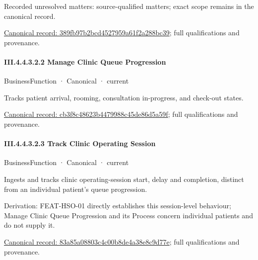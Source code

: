 {\small Recorded unresolved matters: source-qualified matters; exact scope remains in the canonical record.}\par
{\footnotesize \href{../../../../../../../continuum/business/business-function/389fb97b2bcd4527959a61f2a288bc39.md}{Canonical record: 389fb97b2bcd4527959a61f2a288bc39}; full qualifications and provenance.}\par
\paragraph*{III.4.4.3.2.2 Manage Clinic Queue Progression}
\label{navigation:III.4.4.3.2.2}

\label{element:cb3f8c48623b4479988c45de86d5a59f}
{\small BusinessFunction · Canonical · current}\par

Tracks patient arrival, rooming, consultation in-progress, and check-out states.


{\footnotesize \href{../../../../../../../continuum/business/business-function/cb3f8c48623b4479988c45de86d5a59f.md}{Canonical record: cb3f8c48623b4479988c45de86d5a59f}; full qualifications and provenance.}\par
\paragraph*{III.4.4.3.2.3 Track Clinic Operating Session}
\label{navigation:III.4.4.3.2.3}

\label{element:83a85a08803c4c00b8de4a38e8c9d77e}
{\small BusinessFunction · Canonical · current}\par

Ingests and tracks clinic operating-session start, delay and completion, distinct from an individual patient's queue progression.



Derivation: FEAT-HSO-01 directly establishes this session-level behaviour; Manage Clinic Queue Progression and its Process concern individual patients and do not supply it.


{\footnotesize \href{../../../../../../../continuum/business/business-function/83a85a08803c4c00b8de4a38e8c9d77e.md}{Canonical record: 83a85a08803c4c00b8de4a38e8c9d77e}; full qualifications and provenance.}\par
